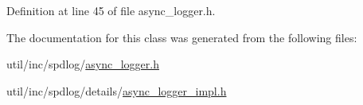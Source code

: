 Definition at line 45 of file async\+\_\+logger.\+h.



The documentation for this class was generated from the following files\+:\begin{DoxyCompactItemize}
\item 
util/inc/spdlog/\hyperlink{async__logger_8h}{async\+\_\+logger.\+h}\item 
util/inc/spdlog/details/\hyperlink{async__logger__impl_8h}{async\+\_\+logger\+\_\+impl.\+h}\end{DoxyCompactItemize}
